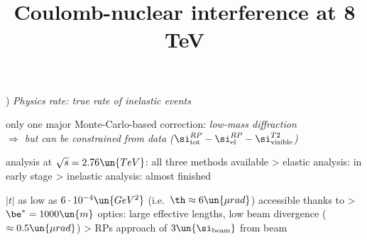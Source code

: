 \vskip2mm
\vskip2mm

) \em{Physics rate}: true rate of inelastic events

\vfil
\> only one major Monte-Carlo-based correction: \em{low-mass diffraction}\\
$\Rightarrow$ but can be constrained from data ($\si_{\rm tot}^{RP} - \si_{\rm el}^{RP} - \si_{\rm visible}^{T2}$)


\newpage %



\newpage %


\> analysis at $\sqrt s = 2.76\un{TeV}$: all three methods available
\>> elastic analysis: in early stage
\>> inelastic analysis: almost finished

\newpage %
\title{Coulomb-nuclear interference at 8 TeV}

\> $|t|$ as low as $6\cdot10^{-4}\un{GeV^2}$ (i.e.~$\th \approx 6\un{\mu rad}$) accessible thanks to
\>> $\be^* = 1000\un{m}$ optics: large effective lengths, low beam divergence ($\approx 0.5\un{\mu rad}$)
\>> RPs approach of $3\un{\si_{\rm beam}}$ from beam

\vfil
{}


